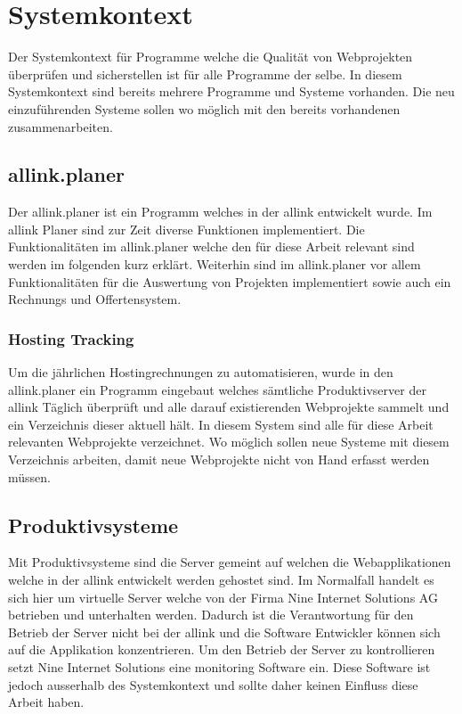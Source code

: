 
 \setcounter{anumber}{0}
\renewcommand\theanumber{A\arabic{anumber}}
\newcommand{\newanumber}[3]%
{%
\midrule%
\refstepcounter{anumber}\label{a:#1}%
\theanumber & #2 & #3 \\
}


\section{Systemkontext}
\label{sec:systemkontext}
Der Systemkontext für Programme welche die Qualität von Webprojekten überprüfen und sicherstellen ist für alle Programme der selbe. In diesem Systemkontext sind bereits mehrere Programme und Systeme vorhanden. Die neu einzuführenden Systeme sollen wo möglich mit den bereits vorhandenen zusammenarbeiten.

\subsection{allink.planer}
\label{sub:allink_planer}
Der allink.planer ist ein Programm welches in der allink entwickelt wurde. Im allink Planer sind zur Zeit diverse Funktionen implementiert. Die Funktionalitäten im allink.planer welche den für diese Arbeit relevant sind werden im folgenden kurz erklärt. Weiterhin sind im allink.planer vor allem Funktionalitäten für die Auswertung von Projekten implementiert sowie auch ein Rechnungs und Offertensystem.

\subsubsection{Hosting Tracking}
\label{ssub:hosting_tracking}
Um die jährlichen Hostingrechnungen zu automatisieren, wurde in den allink.planer ein Programm eingebaut welches sämtliche Produktivserver der allink Täglich überprüft und alle darauf existierenden Webprojekte sammelt und ein Verzeichnis dieser aktuell hält. In diesem System sind alle für diese Arbeit relevanten Webprojekte verzeichnet. Wo möglich sollen neue Systeme mit diesem Verzeichnis arbeiten, damit neue Webprojekte nicht von Hand erfasst werden müssen.

\subsection{Produktivsysteme}
\label{sub:produktivsysteme}
Mit Produktivsysteme sind die Server gemeint auf welchen die Webapplikationen welche in der allink entwickelt werden gehostet sind. Im Normalfall handelt es sich hier um virtuelle Server welche von der Firma Nine Internet Solutions AG betrieben und unterhalten werden. Dadurch ist die Verantwortung für den Betrieb der Server nicht bei der allink und die Software Entwickler können sich auf die Applikation konzentrieren. Um den Betrieb der Server zu kontrollieren setzt Nine Internet Solutions eine monitoring Software ein. Diese Software ist jedoch ausserhalb des Systemkontext und sollte daher keinen Einfluss diese Arbeit haben.


